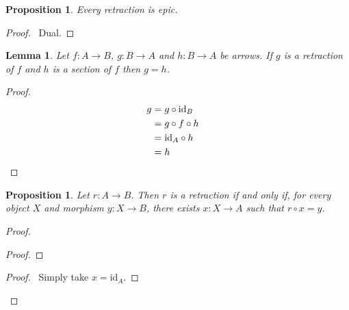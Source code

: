 \documentclass{article}
\let\qed\relax
\newtheorem{lemma}[axiom]{Lemma}
\newtheorem{proposition}[axiom]{Proposition}
\theoremstyle{definition}
\newcommand{\id}[1]{\ensuremath{\mathrm{id}_{#1}}}
\begin{document}
\begin{proposition}
    \label{proposition:retraction_epic}
    Every retraction is epic.
\end{proposition}

\begin{proof}
    \pf\ Dual.
\end{proof}

\begin{lemma}
    \label{lemma:left_inverse_right_inverse}
    Let $f : A \rightarrow B$, $g : B \rightarrow A$ and $h : B \rightarrow A$
    be arrows. If $g$ is a retraction of $f$ and $h$ is a section of $f$ then
    $g = h$.
\end{lemma}

\begin{proof}
    \pf
    \begin{align*}
        g & = g \circ \id{B} \\
        & = g \circ f \circ h \\
        & = \id{A} \circ h \\
        & = h & \qed
    \end{align*}
\end{proof}

\begin{proposition}
    Let $r : A \rightarrow B$. Then $r$ is a retraction if and only if, for every
    object $X$ and morphism $y : X \rightarrow B$, there exists $x : X \rightarrow A$
    such that $r \circ x = y$.
\end{proposition}

\begin{proof}
    \pf
    \begin{proof}
    \end{proof}
    \begin{proof}
        \pf\ Simply take $x = \id{A}$.
    \end{proof}
    \qed
\end{proof}
\end{document}
